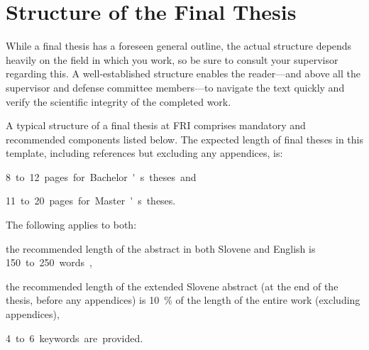 \documentclass[9pt]{style/friteza}
\begin{document}
\section{Structure of the Final Thesis}
\label{sec:struktura}

While a final thesis has a foreseen general outline, the actual structure depends heavily on the field in which you work, so be sure to consult your supervisor regarding this. A well-established structure enables the reader---and above all the supervisor and defense committee members---to navigate the text quickly and verify the scientific integrity of the completed work.

A typical structure of a final thesis at FRI comprises mandatory and recommended components listed below. The expected length of final theses in this template, including references but excluding any appendices, is:
\begin{compactitemize}
\item \qty{8} to \qty{12} pages for Bachelor's theses and
\item \qty{11} to \qty{20} pages for Master's theses.
\end{compactitemize}

The following applies to both:
\begin{compactitemize}
\item the recommended length of the abstract in both Slovene and English is \qty{150} to \qty{250} words,
\item the recommended length of the extended Slovene abstract (at the end of the thesis, before any appendices) is \qty{10}{\percent} of the length of the entire work (excluding appendices),
\item \qty{4} to \qty{6} keywords are provided.
\end{compactitemize}
 
\end{document}
